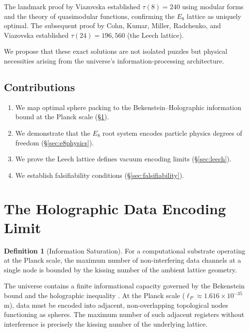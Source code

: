 \documentclass[12pt, a4paper]{article}
\theoremstyle{plain}
\theoremstyle{definition}
\newtheorem{definition}[theorem]{Definition}
\theoremstyle{remark}
\begin{document}
The landmark proof by Viazovska \citeyearpar{Viazovska2017} established $\tau(8) = 240$ using modular forms and the theory of quasimodular functions, confirming the $E_8$ lattice as uniquely optimal. The subsequent proof by Cohn, Kumar, Miller, Radchenko, and Viazovska \citeyearpar{Cohn2017} established $\tau(24) = 196{,}560$ (the Leech lattice).

We propose that these exact solutions are not isolated puzzles but physical necessities arising from the universe's information-processing architecture.

\subsection{Contributions}
\begin{enumerate}
    \item We map optimal sphere packing to the Bekenstein--Holographic information bound at the Planck scale (\S\ref{sec:holographic}).
    \item We demonstrate that the $E_8$ root system encodes particle physics degrees of freedom (\S\ref{sec:e8physics}).
    \item We prove the Leech lattice defines vacuum encoding limits (\S\ref{sec:leech}).
    \item We establish falsifiability conditions (\S\ref{sec:falsifiability}).
\end{enumerate}

\section{The Holographic Data Encoding Limit}\label{sec:holographic}

\begin{definition}[Information Saturation]
For a computational substrate operating at the Planck scale, the maximum number of non-interfering data channels at a single node is bounded by the kissing number of the ambient lattice geometry.
\end{definition}

The universe contains a finite informational capacity governed by the Bekenstein bound and the holographic inequality \citep{tHooft1993, Bousso2002}. At the Planck scale ($\ell_P \approx 1.616 \times 10^{-35}$ m), data must be encoded into adjacent, non-overlapping topological nodes functioning as spheres. The maximum number of such adjacent registers without interference is precisely the kissing number of the underlying lattice.
\end{document}
